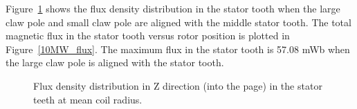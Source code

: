 \documentclass[12pt]{iopart}
\begin{document}
Figure~\ref{10MW_tooth_Bz} shows the flux density distribution in the stator tooth when the large claw pole and small claw pole are aligned with the middle stator tooth.
The total magnetic flux in the stator tooth versus rotor position is plotted in Figure~\ref{10MW_flux}.
The maximum flux in the stator tooth is 57.08 mWb when the large claw pole is aligned with the stator tooth. 

\begin{figure}[]
  \centering
  \hfill
   \caption{Flux density distribution in Z direction (into the page) in the stator teeth at mean coil radius.} 
    \label{10MW_tooth_Bz}
\end{figure}
\end{document}
